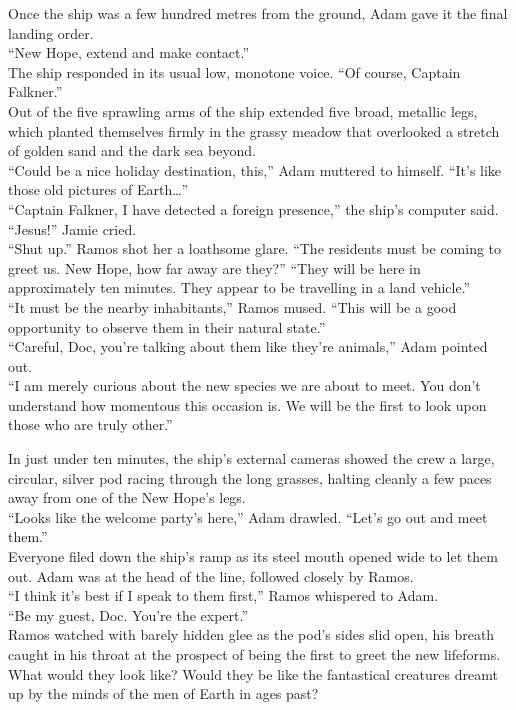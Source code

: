 Once the ship was a few hundred metres from the ground, Adam gave it the final landing order.\\
“New Hope, extend and make contact.”\\
The ship responded in its usual low, monotone voice. “Of course, Captain Falkner.”\\
Out of the five sprawling arms of the ship extended five broad, metallic legs, which planted themselves firmly in the grassy meadow that overlooked a stretch of golden sand and the dark sea beyond.\\
“Could be a nice holiday destination, this,” Adam muttered to himself. “It’s like those old pictures of Earth…”\\
“Captain Falkner, I have detected a foreign presence,” the ship’s computer said.\\
“Jesus!” Jamie cried.\\
“Shut up.” Ramos shot her a loathsome glare. “The residents must be coming to greet us. New Hope, how far away are they?”
“They will be here in approximately ten minutes. They appear to be travelling in a land vehicle.”\\
“It must be the nearby inhabitants,” Ramos mused. “This will be a good opportunity to observe them in their natural state.”\\
“Careful, Doc, you’re talking about them like they’re animals,” Adam pointed out.\\
“I am merely curious about the new species we are about to meet. You don’t understand how momentous this occasion is. We will be the first to look upon those who are truly other.”

In just under ten minutes, the ship’s external cameras showed the crew a large, circular, silver pod racing through the long grasses, halting cleanly a few paces away from one of the New Hope’s legs.\\
“Looks like the welcome party’s here,” Adam drawled. “Let’s go out and meet them.”\\
Everyone filed down the ship’s ramp as its steel mouth opened wide to let them out. Adam was at the head of the line, followed closely by Ramos.\\
“I think it’s best if I speak to them first,” Ramos whispered to Adam.\\
“Be my guest, Doc. You’re the expert.”\\
Ramos watched with barely hidden glee as the pod’s sides slid open, his breath caught in his throat at the prospect of being the first to greet the new lifeforms. What would they look like? Would they be like the fantastical creatures dreamt up by the minds of the men of Earth in ages past?

